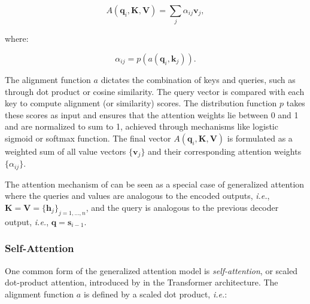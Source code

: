 

\begin{equation}
    A(\bm{q}_i, \bm{K}, \bm{V}) = \sum_j \alpha_{ij} \bm{v}_j,
\end{equation}

\noindent where:

\begin{equation}
    \alpha_{ij} = p(a(\bm{q}_i, \bm{k}_j)).
\end{equation}

\noindent The alignment function $a$ dictates the combination of keys and queries, such as through dot product or cosine similarity. The query vector is compared with each key to compute alignment (or similarity) scores. The distribution function $p$ takes these scores as input and ensures that the attention weights lie between 0 and 1 and are normalized to sum to 1, achieved through mechanisms like logistic sigmoid or softmax function. The final vector $A(\bm{q}_i, \bm{K}, \bm{V})$ is formulated as a weighted sum of all value vectors $\{\bm{v}_j\}$ and their corresponding attention weights $\{\alpha_{ij}\}$.

The attention mechanism of \citet{bahdanau2014neural} can be seen as a special case of generalized attention where the queries and values are analogous to the encoded outputs, \textit{i.e.}, $\bm{K} = \bm{V} = \{\bm{h}_j\}_{j=1, \ldots, n}$, and the query is analogous to the previous decoder output, \textit{i.e.}, $\bm{q} = \bm{s}_{i-1}$. 


\subsubsection{Self-Attention} 
\label{subsubsection:related-pretrained-language-models-sa}

One common form of the generalized attention model is \textit{self-attention}, or scaled dot-product attention, introduced by \citet{vaswani2017attention} in the Transformer architecture. The alignment function $a$ is defined by a scaled dot product, \textit{i.e.}: 

